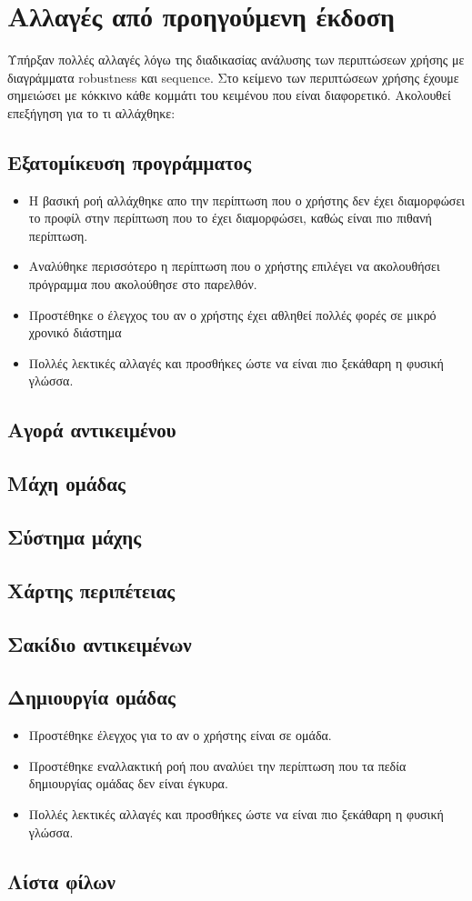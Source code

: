 \section*{Αλλαγές από προηγούμενη έκδοση}
Υπήρξαν πολλές αλλαγές λόγω της διαδικασίας ανάλυσης των περιπτώσεων χρήσης με διαγράμματα robustness και sequence. Στο κείμενο των περιπτώσεων χρήσης έχουμε σημειώσει με κόκκινο κάθε κομμάτι του κειμένου που είναι διαφορετικό. Ακολουθεί επεξήγηση για το τι αλλάχθηκε:

\subsection{Εξατομίκευση προγράμματος}
\begin{itemize}
    \item Η βασική ροή αλλάχθηκε απο την περίπτωση που ο χρήστης δεν έχει διαμορφώσει το προφίλ στην περίπτωση που το έχει διαμορφώσει, καθώς είναι πιο πιθανή περίπτωση.
    \item Αναλύθηκε περισσότερο η περίπτωση που ο χρήστης επιλέγει να ακολουθήσει πρόγραμμα που ακολούθησε στο παρελθόν.
    \item Προστέθηκε ο έλεγχος του αν ο χρήστης έχει αθληθεί πολλές φορές σε μικρό χρονικό διάστημα
    \item Πολλές λεκτικές αλλαγές και προσθήκες ώστε να είναι πιο ξεκάθαρη η φυσική γλώσσα.
\end{itemize}
\subsection{Αγορά αντικειμένου}
\subsection{Μάχη ομάδας}
\subsection{Σύστημα μάχης}
\subsection{Χάρτης περιπέτειας}
\subsection{Σακίδιο αντικειμένων}
\subsection{Δημιουργία ομάδας}
\begin{itemize}
    \item Προστέθηκε έλεγχος για το αν ο χρήστης είναι σε ομάδα.
    \item Προστέθηκε εναλλακτική ροή που αναλύει την περίπτωση που τα πεδία δημιουργίας ομάδας δεν είναι έγκυρα.
    \item Πολλές λεκτικές αλλαγές και προσθήκες ώστε να είναι πιο ξεκάθαρη η φυσική γλώσσα.
\end{itemize}
\subsection{Λίστα φίλων}

\clearpage